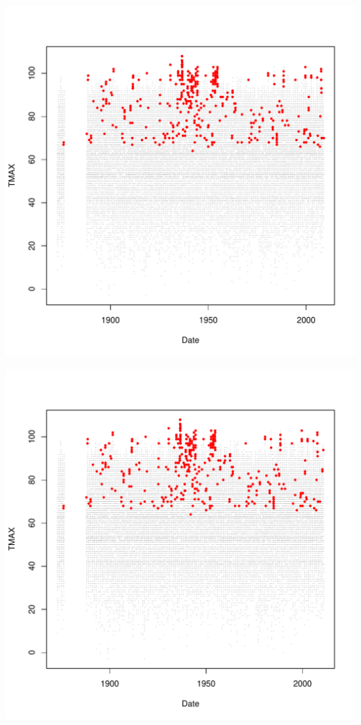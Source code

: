 \documentclass{article}\usepackage[]{graphicx}\usepackage[]{color}
\makeatletter
\def\maxwidth{ %
  \ifdim\Gin@nat@width>\linewidth
    \linewidth
  \else
    \Gin@nat@width
  \fi
}
\newenvironment{knitrout}{}{} %
\makeatother
\begin{document}
\begin{knitrout}
\includegraphics[width=\maxwidth]{figure/unnamed-chunk-4-64} 

\includegraphics[width=\maxwidth]{figure/unnamed-chunk-4-65} 


\end{knitrout}
\end{document}
